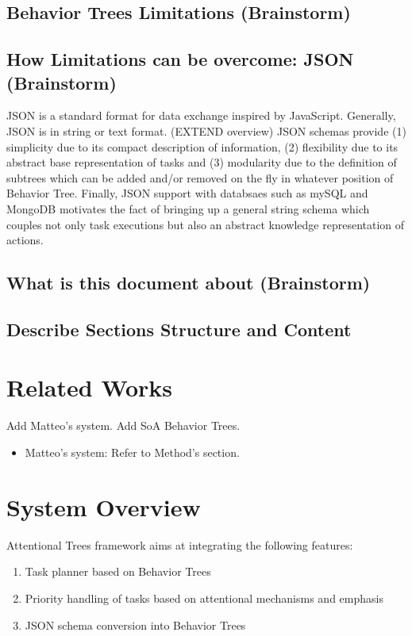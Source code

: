 \documentclass[conference]{IEEEtran}
\begin{document}
\subsection{Behavior Trees Limitations (Brainstorm)}
\subsection{How Limitations can be overcome: JSON (Brainstorm)}
JSON is a standard format for data exchange inspired by JavaScript. Generally, JSON is in string or text format. (EXTEND overview)
JSON schemas provide (1) simplicity due to its compact description of information, (2) flexibility due to its abstract base representation of tasks and (3) modularity due to the definition of subtrees which can be added and/or removed on the fly in whatever position of Behavior Tree.  Finally, JSON support with databsaes such as mySQL and MongoDB motivates the fact of bringing up a general string schema which couples not only task executions but also an abstract knowledge representation of actions.  
\subsection{What is this document about (Brainstorm)}
\subsection{Describe Sections Structure and Content}
\section{Related Works}
Add Matteo's system. Add SoA Behavior Trees.
\begin{itemize}
\item Matteo's system: Refer to Method's section. 
\end{itemize}

\section{System Overview}
Attentional Trees framework aims at integrating the following features:
\begin{enumerate}
\item Task planner based on Behavior Trees
\item Priority handling of tasks based on attentional mechanisms and emphasis \cite{b2}
\item JSON schema conversion into Behavior Trees 
\end{enumerate}
\end{document}
